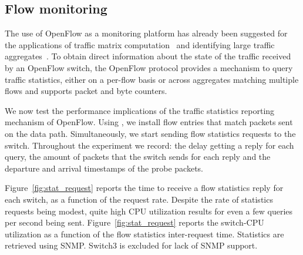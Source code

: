 \subsection{Flow monitoring}\label{sec:results-monitoring}

The use of OpenFlow as a monitoring platform has already been
suggested for the applications of traffic matrix
computation~\cite{opentm-pam,tm-presto} and identifying large traffic
aggregates~\cite{openflow-measurement-hotice}. To obtain direct
information about the state of the traffic received by an OpenFlow
switch, the OpenFlow protocol provides a mechanism to query traffic
statistics, either on a per-flow basis or across aggregates matching
multiple flows and supports packet and byte counters. 

We now test the performance implications of the traffic statistics reporting 
mechanism of OpenFlow. Using \oflops, we install flow entries that match 
packets sent on the data path. Simultaneously, we start sending flow statistics 
requests to the switch. Throughout the experiment we record: the delay getting 
a reply for each query, the amount of packets that the switch sends for each 
reply and the departure and arrival timestamps of the probe packets.

Figure~\ref{fig:stat_request} reports the time to receive a flow
statistics reply for each switch, as a function of the request
rate. Despite the rate of statistics requests being modest, quite high
CPU utilization results for even a few queries per second being
sent. Figure~\ref{fig:stat_request} reports the switch-CPU utilization
as a function of the flow statistics inter-request time. Statistics
are retrieved using SNMP. Switch3 is excluded for lack of SNMP
support.

